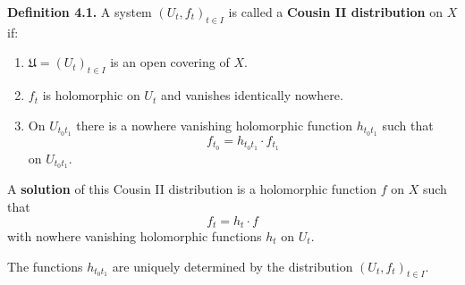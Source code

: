 \textbf{Definition 4.1.} A system $(U_t, f_t)_{t \in I}$ is called a
\textbf{Cousin II distribution} on $X$ if:

\begin{enumerate}
\item $\mathfrak{U} = (U_t)_{t \in I}$ is an open covering of $X$.
\item $f_t$ is holomorphic on $U_t$ and vanishes identically nowhere.
\item On $U_{t_0 t_1}$ there is a nowhere vanishing holomorphic function
$h_{t_0 t_1}$ such that
$$f_{t_0} = h_{t_0 t_1} \cdot f_{t_1}$$
on $U_{t_0 t_1}$.
\end{enumerate}

A \textbf{solution} of this Cousin II distribution is a holomorphic function
$f$ on $X$ such that
$$f_t = h_t \cdot f$$
with nowhere vanishing holomorphic functions $h_t$ on $U_t$.

The functions $h_{t_0 t_1}$ are uniquely determined by the distribution
$(U_t, f_t)_{t \in I}$.
